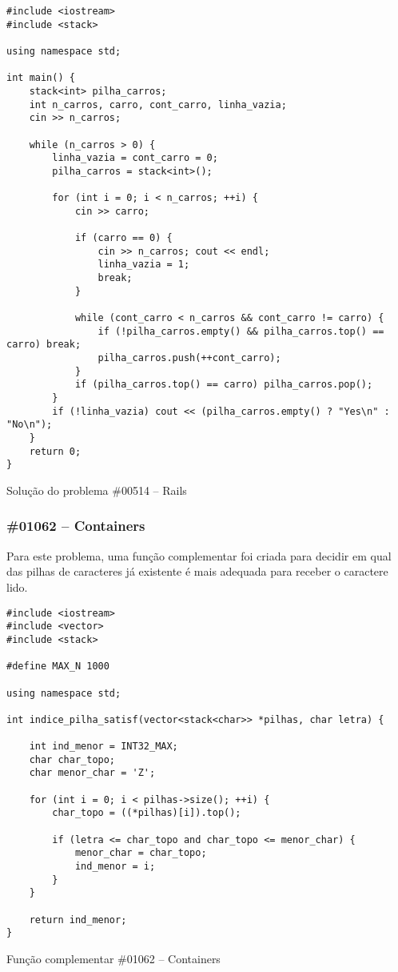 \documentclass[a4paper,12pt]{scrartcl}
\begin{document}
\begin{listing}[H]
\begin{verbatim}
#include <iostream>
#include <stack>

using namespace std;

int main() {
    stack<int> pilha_carros;
    int n_carros, carro, cont_carro, linha_vazia;
    cin >> n_carros;

    while (n_carros > 0) {
        linha_vazia = cont_carro = 0;
        pilha_carros = stack<int>();

        for (int i = 0; i < n_carros; ++i) {
            cin >> carro;

            if (carro == 0) {
                cin >> n_carros; cout << endl;
                linha_vazia = 1;
                break;
            }

            while (cont_carro < n_carros && cont_carro != carro) {
                if (!pilha_carros.empty() && pilha_carros.top() == carro) break;
                pilha_carros.push(++cont_carro);
            }
            if (pilha_carros.top() == carro) pilha_carros.pop();
        }
        if (!linha_vazia) cout << (pilha_carros.empty() ? "Yes\n" : "No\n");
    }
    return 0;
}
\end{verbatim}
\caption{\footnotesize{Solução do problema \#00514 – Rails}}
\end{listing}

\subsubsection{\#01062 – Containers}
Para este problema, uma função complementar foi criada para decidir em qual das pilhas de caracteres já existente é mais adequada para receber o caractere lido.

\begin{listing}[H]
\begin{verbatim}
#include <iostream>
#include <vector>
#include <stack>

#define MAX_N 1000

using namespace std;

int indice_pilha_satisf(vector<stack<char>> *pilhas, char letra) {

    int ind_menor = INT32_MAX;
    char char_topo;
    char menor_char = 'Z';

    for (int i = 0; i < pilhas->size(); ++i) {
        char_topo = ((*pilhas)[i]).top();

        if (letra <= char_topo and char_topo <= menor_char) {
            menor_char = char_topo;
            ind_menor = i;
        }
    }

    return ind_menor;
}
\end{verbatim}
\caption{\footnotesize{Função complementar \#01062 – Containers}}
\end{listing}
\end{document}
